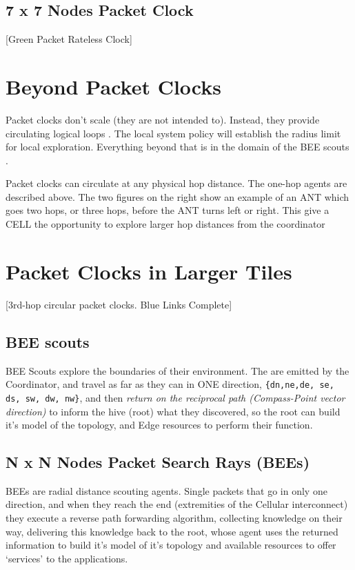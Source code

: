 \documentclass[../../../OAE-SPEC-MAIN.tex]{subfiles}
\begin{document}
\subsection{7 x 7 Nodes Packet Clock}
\marginnote{}

[Green Packet Rateless Clock]

\section{Beyond Packet Clocks}

Packet clocks don't scale (they are not intended to). Instead, they provide circulating logical loops \cite{Lamport1978}.  The local system policy will establish the radius limit for local exploration. Everything beyond that is in the domain of the BEE scouts .

Packet clocks can circulate at any physical hop distance. The one-hop agents are described above.  The two figures on the right show an example of an ANT which goes two hops, or three hops, before the ANT turns left or right.  This give a CELL the opportunity to explore larger hop distances from the coordinator

\section{Packet Clocks in Larger Tiles}

[3rd-hop circular packet clocks. Blue Links Complete]

\subsection{BEE scouts}

BEE Scouts explore the boundaries of their environment.  The are emitted by the Coordinator, and travel as far as they can in ONE direction, \texttt{\{dn,ne,de, se, ds, sw, dw, nw\}}, and then \emph{return on the reciprocal path (Compass-Point vector direction)} to inform the hive (root) what they discovered, so the root can build it's model of the topology, and Edge resources to perform their function. 

\subsection{N x N Nodes Packet Search Rays (BEEs)}

BEEs  are radial distance scouting agents. Single packets that go in only one direction, and when they reach the end (extremities of the Cellular interconnect) they execute a reverse path forwarding algorithm, collecting knowledge on their way, delivering this knowledge back to the root, whose agent  uses the returned information to build it's model of it's topology and available resources to offer `services' to the applications.
\end{document}
